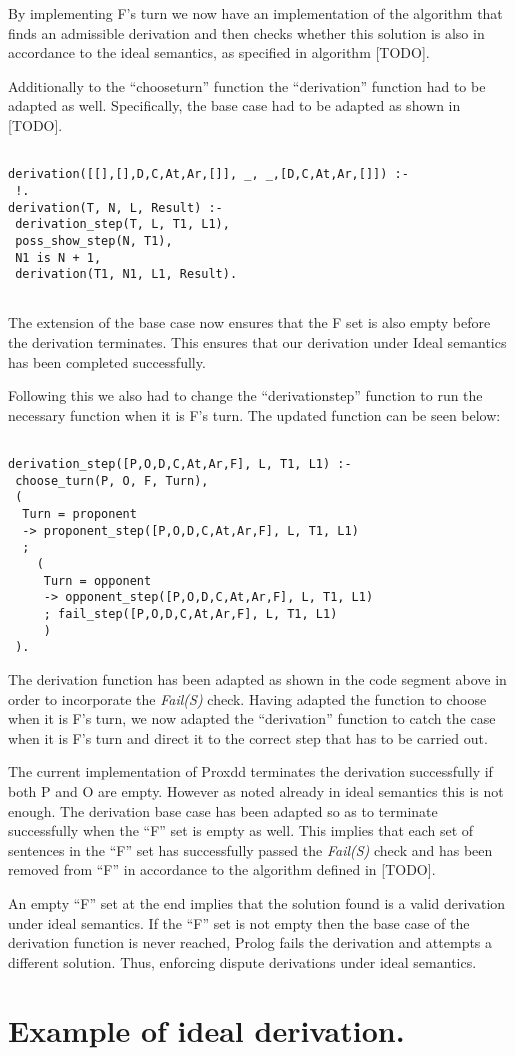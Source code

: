 By implementing F's turn we now have an implementation of the algorithm that finds an admissible derivation and then checks whether this solution is also in accordance to the ideal semantics, as specified in algorithm [TODO].

Additionally to the ``choose\textunderscore turn'' function the ``derivation'' function had to be adapted as well. Specifically, the base case had to be adapted as shown in [TODO].

\begin{Verbatim}[frame=single]

derivation([[],[],D,C,At,Ar,[]], _, _,[D,C,At,Ar,[]]) :-
 !.
derivation(T, N, L, Result) :-
 derivation_step(T, L, T1, L1),
 poss_show_step(N, T1),
 N1 is N + 1,
 derivation(T1, N1, L1, Result).
 
\end{Verbatim}

The extension of the base case now ensures that the F set is also empty before the derivation terminates. This ensures that our derivation under Ideal semantics has been completed successfully.

Following this we also had to change the ``derivation\textunderscore step'' function to run the necessary function when it is F's turn. The updated function can be seen below:

\begin{Verbatim}[frame=single]

derivation_step([P,O,D,C,At,Ar,F], L, T1, L1) :-
 choose_turn(P, O, F, Turn),
 (
  Turn = proponent
  -> proponent_step([P,O,D,C,At,Ar,F], L, T1, L1)
  ; 
	(
	 Turn = opponent
	 -> opponent_step([P,O,D,C,At,Ar,F], L, T1, L1)
	 ; fail_step([P,O,D,C,At,Ar,F], L, T1, L1)
	 )
 ).

\end{Verbatim}

The derivation function has been adapted as shown in the code segment above in order to incorporate the \emph{Fail(S)} check. Having adapted the function to choose when it is F's turn, we now adapted the ``derivation'' function to catch the case when it is F's turn and direct it to the correct step that has to be carried out.

The current implementation of Proxdd terminates the derivation successfully if both P and O are empty. However as noted already in ideal semantics this is not enough. The derivation base case has been adapted so as to terminate successfully when the ``F'' set is empty as well. This implies that each set of sentences in the ``F'' set has successfully  passed the \emph{Fail(S)} check and has been removed from ``F'' in accordance to the algorithm defined in [TODO]. 

An empty ``F'' set at the end implies that the solution found is a valid derivation under ideal semantics. If the ``F'' set is not empty then the base case of the derivation function is never reached, Prolog fails the derivation and attempts a different solution. Thus, enforcing dispute derivations under ideal semantics.

\section{Example of ideal derivation.}